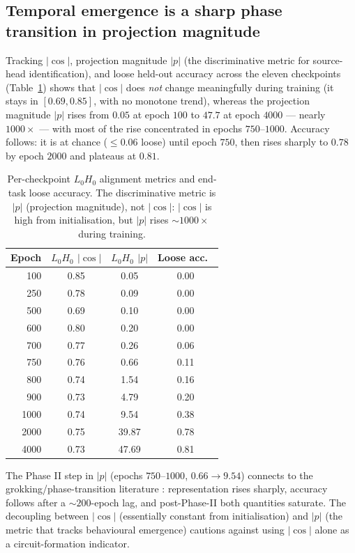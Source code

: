\documentclass{article}
\begin{document}
\subsection{Temporal emergence is a sharp phase transition in projection magnitude}
\label{sec:emergence}

Tracking $|\cos|$, projection magnitude $|p|$ (the discriminative metric for source-head identification), and loose held-out accuracy across the eleven checkpoints (Table~\ref{tab:temporal}) shows that $|\cos|$ does \emph{not} change meaningfully during training (it stays in $[0.69, 0.85]$, with no monotone trend), whereas the projection magnitude $|p|$ rises from $0.05$ at epoch $100$ to $47.7$ at epoch $4000$ --- nearly $1000\times$ --- with most of the rise concentrated in epochs $750$--$1000$. Accuracy follows: it is at chance ($\leq 0.06$ loose) until epoch $750$, then rises sharply to $0.78$ by epoch $2000$ and plateaus at $0.81$.

\begin{table}[t]
\centering
\small
\caption{Per-checkpoint $L_0H_0$ alignment metrics and end-task loose accuracy. The discriminative metric is $|p|$ (projection magnitude), not $|\cos|$: $|\cos|$ is high from initialisation, but $|p|$ rises $\sim\!1000\times$ during training.}
\label{tab:temporal}
\begin{tabular}{rccc}
\toprule
Epoch & $L_0H_0$ $|\cos|$ & $L_0H_0$ $|p|$ & Loose acc.\ \\
\midrule
100  & 0.85 &  0.05 & 0.00 \\
250  & 0.78 &  0.09 & 0.00 \\
500  & 0.69 &  0.10 & 0.00 \\
600  & 0.80 &  0.20 & 0.00 \\
700  & 0.77 &  0.26 & 0.06 \\
750  & 0.76 &  0.66 & 0.11 \\
800  & 0.74 &  1.54 & 0.16 \\
900  & 0.73 &  4.79 & 0.20 \\
1000 & 0.74 &  9.54 & 0.38 \\
2000 & 0.75 & 39.87 & 0.78 \\
4000 & 0.73 & 47.69 & 0.81 \\
\bottomrule
\end{tabular}
\end{table}

The Phase II step in $|p|$ (epochs $750$--$1000$, $0.66\to 9.54$) connects to the grokking/phase-transition literature \citep{nanda2023progress}: representation rises sharply, accuracy follows after a $\sim\!200$-epoch lag, and post-Phase-II both quantities saturate. The decoupling between $|\cos|$ (essentially constant from initialisation) and $|p|$ (the metric that tracks behavioural emergence) cautions against using $|\cos|$ alone as a circuit-formation indicator.
\end{document}

